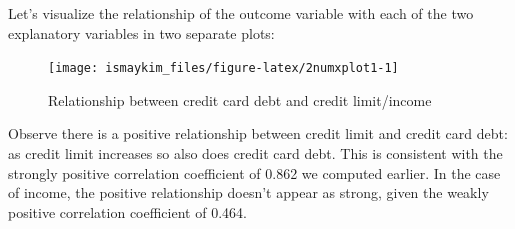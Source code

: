 \documentclass[12pt, krantz2,]{krantz}
\makeatletter
\newenvironment{Shaded}{\begin{snugshade}}{\end{snugshade}}
\newcommand{\DataTypeTok}[1]{\textcolor[rgb]{0.27,0.27,0.27}{#1}}
\newcommand{\KeywordTok}[1]{\textcolor[rgb]{0.27,0.27,0.27}{\textbf{#1}}}
\newcommand{\NormalTok}[1]{#1}
\newcommand{\OperatorTok}[1]{\textcolor[rgb]{0.43,0.43,0.43}{\textbf{#1}}}
\newcommand{\OtherTok}[1]{\textcolor[rgb]{0.37,0.37,0.37}{#1}}
\newcommand{\StringTok}[1]{\textcolor[rgb]{0.5,0.5,0.5}{#1}}
\newenvironment{kframe}{%
\medskip{}
\setlength{\fboxsep}{.8em}
 \def\at@end@of@kframe{}%
 \ifinner\ifhmode%
  \def\at@end@of@kframe{\end{minipage}}%
  \begin{minipage}{\columnwidth}%
 \fi\fi%
 \def\FrameCommand##1{\hskip\@totalleftmargin \hskip-\fboxsep
 \colorbox{shadecolor}{##1}\hskip-\fboxsep
     \hskip-\linewidth \hskip-\@totalleftmargin \hskip\columnwidth}%
 \MakeFramed {\advance\hsize-\width
   \@totalleftmargin\z@ \linewidth\hsize
   \@setminipage}}%
 {\par\unskip\endMakeFramed%
 \at@end@of@kframe}
\renewenvironment{Shaded}{\begin{kframe}}{\end{kframe}}
\makeatother
\begin{document}
Let's visualize the relationship of the outcome variable with each of the two explanatory variables in two separate plots:

\begin{Shaded}
\end{Shaded}

\begin{figure}

{\centering \texttt{[image: ismaykim\_files/figure-latex/2numxplot1-1]} 

}

\caption{Relationship between credit card debt and credit limit/income}\label{fig:2numxplot1}
\end{figure}

Observe there is a positive relationship between credit limit and credit card debt: as credit limit increases so also does credit card debt. This is consistent with the strongly positive correlation coefficient of 0.862 we computed earlier. In the case of income, the positive relationship doesn't appear as strong, given the weakly positive correlation coefficient of 0.464.
\end{document}
